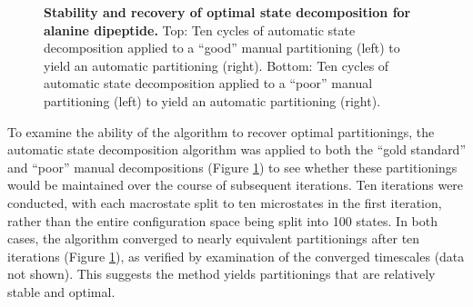 \begin{figure}[tb]
  \begin{center}
  \end{center}
  \caption{{\bf Stability and recovery of optimal state decomposition for alanine dipeptide.}
  Top: Ten cycles of automatic state decomposition applied to a ``good'' manual partitioning (left) to yield an automatic partitioning (right).
  Bottom: Ten cycles of automatic state decomposition applied to a ``poor'' manual partitioning (left) to yield an automatic partitioning (right).
  }
  \label{automatic:figure:alanine-dipeptide-decomposition-stability}
\end{figure}

To examine the ability of the algorithm to recover optimal partitionings, the automatic state decomposition algorithm was applied to both the ``gold standard'' and ``poor'' manual decompositions (Figure \ref{automatic:figure:alanine-dipeptide-decomposition-stability}) to see whether these partitionings would be maintained over the course of subsequent iterations.
Ten iterations were conducted, with each macrostate split to ten microstates in the first iteration, rather than the entire configuration space being split into 100 states.
In both cases, the algorithm converged to nearly equivalent partitionings after ten iterations (Figure \ref{automatic:figure:alanine-dipeptide-decomposition-stability}), as verified by examination of the converged timescales (data not shown).
This suggests the method yields partitionings that are relatively stable and optimal.

